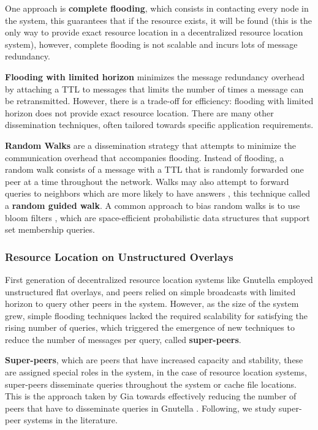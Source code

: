 One approach is \textbf{complete flooding}, which consists in contacting every node in the system, this guarantees that if the resource exists, it will be found (this is the only way to provide exact resource location in a decentralized resource location system), however, complete flooding is not scalable and incurs lots of message redundancy. 

\textbf{Flooding with limited horizon} minimizes the message redundancy overhead by attaching a TTL to messages that limits the number of times a message can be retransmitted. However, there is a trade-off for efficiency: flooding with limited horizon does not provide exact resource location. There are many other dissemination techniques, often tailored towards specific application requirements.

\textbf{Random Walks} are a dissemination strategy that attempts to minimize the communication overhead that accompanies flooding. Instead of flooding, a random walk consists of a message with a TTL that is randomly forwarded one peer at a time throughout the network. Walks may also attempt to forward queries to neighbors which are more likely to have answers \cite{1022239}, this technique called a \textbf{random guided walk}. A common approach to bias random walks is to use bloom filters \cite{5751342}, which are space-efficient probabilistic data structures that support set membership queries.

\subsubsection{Resource Location on Unstructured Overlays}

First generation of decentralized resource location systems like Gnutella \cite{gnutella_gtk} employed unstructured flat overlays, and peers relied on simple broadcasts with limited horizon to query other peers in the system. However, as the size of the system grew, simple flooding techniques lacked the required scalability for satisfying the rising number of queries, which triggered the emergence of new techniques to reduce the number of messages per query, called \textbf{super-peers}. 

\textbf{Super-peers}, which are peers that have increased capacity and stability, these are assigned special roles in the system, in the case of resource location systems, super-peers disseminate queries throughout the system or cache file locations. This is the approach taken by Gia \cite{Chawathe2003} towards effectively reducing the number of peers that have to disseminate queries in Gnutella \cite{gnutella_gtk}. Following, we study super-peer systems in the literature.


